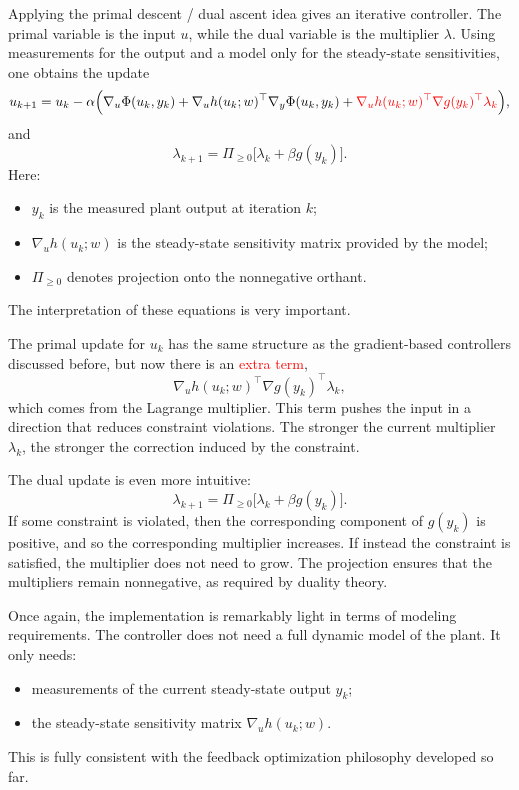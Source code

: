 Applying the primal descent / dual ascent idea gives an iterative controller. The primal variable is the input $u$, while the dual variable is the multiplier $\lambda$. Using measurements for the output and a model only for the steady-state sensitivities, one obtains the update
\[
u_{k+1}
=
u_k
-
\alpha\Bigl(
\nabla_u \Phi(u_k,y_k)
+
\nabla_u h(u_k;w)^\top \nabla_y \Phi(u_k,y_k)
+
\textcolor{red}{\nabla_u h(u_k;w)^\top \nabla g(y_k)^\top \lambda_k}
\Bigr),
\]
and
\[
\lambda_{k+1}
=
\Pi_{\ge 0}\bigl[\lambda_k+\beta g(y_k)\bigr].
\]
Here:
\begin{itemize}
    \item $y_k$ is the measured plant output at iteration $k$;
    \item $\nabla_u h(u_k;w)$ is the steady-state sensitivity matrix provided by the model;
    \item $\Pi_{\ge 0}$ denotes projection onto the nonnegative orthant.
\end{itemize}

The interpretation of these equations is very important.

The primal update for $u_k$ has the same structure as the gradient-based controllers discussed before, but now there is an \textcolor{red}{extra term},
\[
\nabla_u h(u_k;w)^\top \nabla g(y_k)^\top \lambda_k,
\]
which comes from the Lagrange multiplier. This term pushes the input in a direction that reduces constraint violations. The stronger the current multiplier $\lambda_k$, the stronger the correction induced by the constraint.

The dual update is even more intuitive:
\[
\lambda_{k+1}
=
\Pi_{\ge 0}\bigl[\lambda_k+\beta g(y_k)\bigr].
\]
If some constraint is violated, then the corresponding component of $g(y_k)$ is positive, and so the corresponding multiplier increases. If instead the constraint is satisfied, the multiplier does not need to grow. The projection ensures that the multipliers remain nonnegative, as required by duality theory.

Once again, the implementation is remarkably light in terms of modeling requirements. The controller does not need a full dynamic model of the plant. It only needs:
\begin{itemize}
    \item measurements of the current steady-state output $y_k$;
    \item the steady-state sensitivity matrix $\nabla_u h(u_k;w)$.
\end{itemize}
This is fully consistent with the feedback optimization philosophy developed so far.

